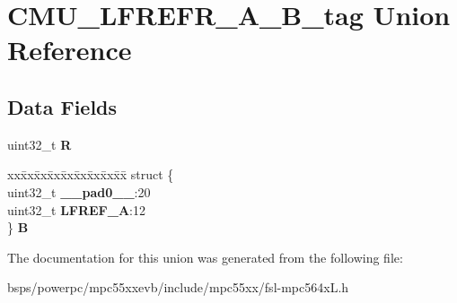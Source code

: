 \hypertarget{unionCMU__LFREFR__A__32B__tag}{}\section{C\+M\+U\+\_\+\+L\+F\+R\+E\+F\+R\+\_\+\+A\+\_\+B\+\_\+tag Union Reference}
\label{unionCMU__LFREFR__A__32B__tag}
\subsection*{Data Fields}
\begin{DoxyCompactItemize}
\item 
\mbox{\label{unionCMU__LFREFR__A__32B__tag_a491ae572a2e0639596196969ee06db34}} 
uint32\+\_\+t {\bfseries R}
\item 
\mbox{\label{unionCMU__LFREFR__A__32B__tag_a3058d91a93946107a3af8c0797912af2}} 
\begin{tabbing}
xx\=xx\=xx\=xx\=xx\=xx\=xx\=xx\=xx\=\kill
struct \{\\
\>uint32\_t {\bfseries \_\_pad0\_\_}:20\\
\>uint32\_t {\bfseries LFREF\_A}:12\\
\} {\bfseries B}\\

\end{tabbing}\end{DoxyCompactItemize}


The documentation for this union was generated from the following file\+:\begin{DoxyCompactItemize}
\item 
bsps/powerpc/mpc55xxevb/include/mpc55xx/fsl-\/mpc564x\+L.\+h\end{DoxyCompactItemize}
